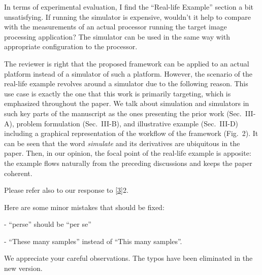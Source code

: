 \begin{reviewer}
In terms of experimental evaluation, I find the ``Real-life Example'' section a
bit unsatisfying. If running the simulator is expensive, wouldn't it help to
compare with the measurements of an actual processor running the target image
processing application? The simulator can be used in the same way with
appropriate configuration to the processor.
\end{reviewer}

\begin{authors}
The reviewer is right that the proposed framework can be applied to an actual
platform instead of a simulator of such a platform. However, the scenario of the
real-life example revolves around a simulator due to the following reason. This
use case is exactly the one that this work is primarily targeting, which is
emphasized throughout the paper. We talk about simulation and simulators in such
key parts of the manuscript as the ones presenting the prior work (Sec.~III-A),
problem formulation (Sec.~III-B), and illustrative example (Sec.~III-D)
including a graphical representation of the workflow of the framework (Fig.~2).
It can be seen that the word \emph{simulate} and its derivatives are ubiquitous
in the paper. Then, in our opinion, the focal point of the real-life example is
apposite: the example flows naturally from the preceding discussions and keeps
the paper coherent.

Please refer also to our response to \cref{3}{2}.
\end{authors}

\begin{reviewer}
Here are some minor mistakes that should be fixed:

\noindent- ``perse'' should be ``per se''

\noindent- ``These many samples'' instead of ``This many samples''.
\end{reviewer}

\begin{authors}
We appreciate your careful observations. The typos have been eliminated in the
new version.

\begin{actions}
\end{actions}
\end{authors}
